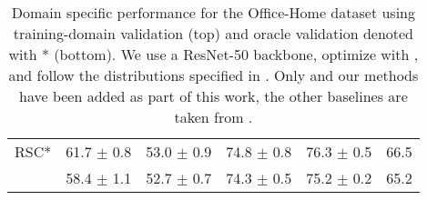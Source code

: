 \begin{table*}
\begin{center}
\begin{tabular}{lccccc}
RSC*                  & 61.7 $\pm$ 0.8       & 53.0 $\pm$ 0.9       & 74.8 $\pm$ 0.8       & 76.3 $\pm$ 0.5       & 66.5                \\
\tdivcams 	          & 58.4 $\pm$ 1.1       & 52.7 $\pm$ 0.7        & 74.3 $\pm$ 0.5       & 75.2 $\pm$ 0.2        & 65.2                 \\
\bottomrule
\end{tabular}
\caption[Domain specific performance for the Office-Home dataset]{Domain specific performance for the Office-Home dataset using training-domain validation (top) and  oracle validation denoted with * (bottom). We use a ResNet-50 backbone, optimize with \adam, and follow the distributions specified in \domainbed. Only \rsc and our methods have been added as part of this work, the other baselines are taken from \domainbed.}
\end{center}
\end{table*}

